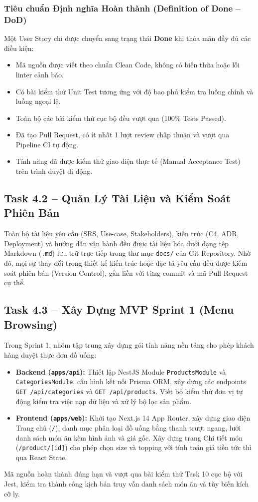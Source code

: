 \documentclass[11pt,a4paper]{article}
\begin{document}
\subsubsection{Tiêu chuẩn Định nghĩa Hoàn thành (Definition of Done -- DoD)}
Một User Story chỉ được chuyển sang trạng thái \textbf{Done} khi thỏa mãn đầy đủ các điều kiện:
\begin{itemize}[leftmargin=*]
    \item Mã nguồn được viết theo chuẩn Clean Code, không có biến thừa hoặc lỗi linter cảnh báo.
    \item Có bài kiểm thử Unit Test tương ứng với độ bao phủ kiểm tra luồng chính và luồng ngoại lệ.
    \item Toàn bộ các bài kiểm thử cục bộ đều vượt qua (100\% Tests Passed).
    \item Đã tạo Pull Request, có ít nhất 1 lượt review chấp thuận và vượt qua Pipeline CI tự động.
    \item Tính năng đã được kiểm thử giao diện thực tế (Manual Acceptance Test) trên trình duyệt di động.
\end{itemize}

\subsection{Task 4.2 -- Quản Lý Tài Liệu và Kiểm Soát Phiên Bản}
Toàn bộ tài liệu yêu cầu (SRS, Use-case, Stakeholders), kiến trúc (C4, ADR, Deployment) và hướng dẫn vận hành đều được tài liệu hóa dưới dạng tệp Markdown (\texttt{.md}) lưu trữ trực tiếp trong thư mục \texttt{docs/} của Git Repository. Nhờ đó, mọi sự thay đổi trong thiết kế kiến trúc hoặc đặc tả yêu cầu đều được kiểm soát phiên bản (Version Control), gắn liền với từng commit và mã Pull Request cụ thể.

\subsection{Task 4.3 -- Xây Dựng MVP Sprint 1 (Menu Browsing)}
Trong Sprint 1, nhóm tập trung xây dựng gói tính năng nền tảng cho phép khách hàng duyệt thực đơn đồ uống:
\begin{itemize}[leftmargin=*]
    \item \textbf{Backend (\texttt{apps/api}):} Thiết lập NestJS Module \texttt{ProductsModule} và \texttt{CategoriesModule}, cấu hình kết nối Prisma ORM, xây dựng các endpoints \texttt{GET /api/categories} và \texttt{GET /api/products}. Viết bộ kiểm thử đơn vị tự động kiểm tra việc nạp dữ liệu và xử lý bộ lọc sản phẩm.
    \item \textbf{Frontend (\texttt{apps/web}):} Khởi tạo Next.js 14 App Router, xây dựng giao diện Trang chủ (\texttt{/}), danh mục phân loại đồ uống bằng thanh trượt ngang, lưới danh sách món ăn kèm hình ảnh và giá gốc. Xây dựng trang Chi tiết món (\texttt{/product/[id]}) cho phép chọn size và topping với tính toán giá tiền tức thì qua React State.
\end{itemize}
Mã nguồn hoàn thành đúng hạn và vượt qua bài kiểm thử Task 10 cục bộ với Jest, kiểm tra thành công kịch bản truy vấn danh sách món ăn và tùy biến kích cỡ ly.
\clearpage
\end{document}
